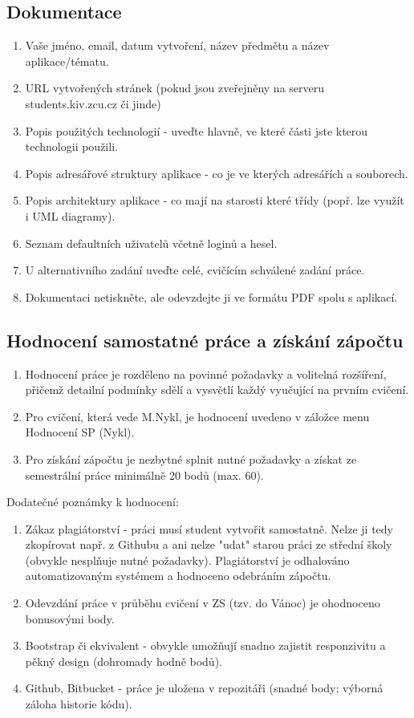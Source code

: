 \documentclass[12pt, a4paper]{report}
\begin{document}
\subsection{Dokumentace}
\begin{enumerate}[left=1cm] %
\item Vaše jméno, email, datum vytvoření, název předmětu a název aplikace/tématu.
\item URL vytvořených stránek (pokud jsou zveřejněny na serveru students.kiv.zcu.cz či jinde)
\item Popis použitých technologií - uveďte hlavně, ve které části jste kterou technologii použili.
\item Popis adresářové struktury aplikace - co je ve kterých adresářích a souborech.
\item Popis architektury aplikace - co mají na starosti které třídy (popř. lze využít i UML diagramy).
\item Seznam defaultních uživatelů včetně loginů a hesel.
\item U alternativního zadání uveďte celé, cvičícím schválené zadání práce.
\item Dokumentaci netiskněte, ale odevzdejte ji ve formátu PDF spolu s aplikací.
\end{enumerate}



\subsection{Hodnocení samostatné práce a získání zápočtu}
\begin{enumerate}[left=1cm] %
    \item Hodnocení práce je rozděleno na povinné požadavky a volitelná rozšíření, přičemž detailní podmínky sdělí a vysvětlí každý vyučující na prvním cvičení.
    \item Pro cvičení, která vede M.Nykl, je hodnocení uvedeno v záložce menu Hodnocení SP (Nykl).
    \item Pro získání zápočtu je nezbytné splnit nutné požadavky a získat ze semestrální práce minimálně 20 bodů (max. 60).
\end{enumerate}
Dodatečné poznámky k hodnocení:
\begin{enumerate}[left=1cm] %
    \item Zákaz plagiátorství - práci musí student vytvořit samostatně. Nelze ji tedy zkopírovat např. z Githubu a ani nelze "udat" starou práci ze střední školy (obvykle nesplňuje nutné požadavky). Plagiátorství je odhalováno automatizovaným systémem a hodnoceno odebráním zápočtu. 
    \item Odevzdání práce v průběhu cvičení v ZS (tzv. do Vánoc) je ohodnoceno bonusovými body.
    \item Bootstrap či ekvivalent - obvykle umožňují snadno zajistit responzivitu a pěkný design (dohromady hodně bodů).
    \item Github, Bitbucket  - práce je uložena v repozitáři (snadné body; výborná záloha historie kódu).

\end{enumerate}
\end{document}
